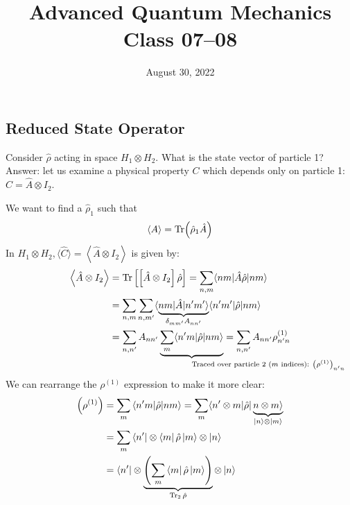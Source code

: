 \documentclass[12pt]{article}
\title{Advanced Quantum Mechanics\\Class 07--08}
\date{August 30, 2022}                                           %
\newcommand{\be}{\begin{equation}}
\newcommand{\ee}{\end{equation}}
\begin{document}
\maketitle

\subsection{Reduced State Operator}

Consider \(\hat{\rho}\) acting in space \(H_{1} \otimes H_{2}\).
What is the state vector of particle 1?
Answer: let us examine a physical property \(C\)
which depends only on particle 1: \(\hat{C}=\hat{A} \otimes I_{2}\).

We want to find a \(\hat{\rho}_{1}\) such that
\be
\ev{A} = \Tr(\hat{\rho}_{1}\hat{A})
\ee
\setcounter{equation}{51}
In \(H_{1} \otimes H_{2},\langle\hat{C}\rangle=\left\langle\hat{A} \otimes I_{2}\right\rangle\) is given by:
\be
\begin{aligned}
\left\langle\hat{A} \otimes I_{2}\right\rangle
&=\Tr\left[\left[\hat{A} \otimes I_{2}\right] \hat{\rho}\right]
=\sum_{n, m}\langle n m|\hat{A} \hat{\rho}| n m\rangle\\
&=\sum_{n, m} \sum_{n, m^{\prime}}\langle\underbrace{n m|\hat{A}| n^{\prime} m^{\prime}\rangle}%
_{\delta_{mm^\prime}A_{nn^\prime}}
\langle n^{\prime}m^{\prime}|\hat{\rho}| n m\rangle\\
&=\sum_{n, n^{\prime}} A_{nn^{\prime}}%
\underbrace{\sum_{m}\langle n^{\prime}m|\hat{\rho}| n m\rangle}%
_{\mathrlap{\text{Traced over particle 2 ($m$ indices): }\left(\rho^{(1)}\right)_{n^{\prime}n}}}
=\sum_{n,n^{\prime}} A_{nn^\prime} \rho_{n^{\prime}n}^{(1)}\\
\end{aligned}
\label{eq:g52}
\ee
We can rearrange the $\rho^{(1)}$ expression to make it more clear:
\[
\begin{aligned}
\left(\rho^{(1)}\right)
&=\sum_{m}\left\langle n^{\prime} m|\hat{\rho}| n m\right\rangle
= \sum_{m}     \langle n^{\prime} \otimes m |\hat{\rho}| 
\underbrace{n \otimes m \rangle}%
_{\ket{n}\otimes\ket{m}}
\\
&=\sum_{m}\bra{n^\prime}\otimes\bra{m}\hat{\rho}\ket{m}\otimes\ket{n}\\
&=\bra{n^\prime}\otimes
\underbrace{\left(\sum_{m}\bra{m}\hat{\rho}\ket{m}\right)}%
_{\Tr_2 \hat{\rho}}
\otimes\ket{n}\\
\end{aligned}
\]
\end{document}
